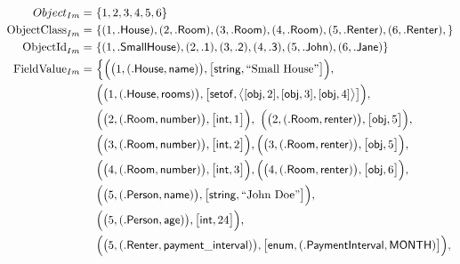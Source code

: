 \begin{figure}[p]
    \begin{subfigure}{\textwidth}
        \centering
        \begin{align*}
            Object_{Im} =\ & \{ 
                1, 2, 3, 4, 5, 6
            \}\\
            \mathrm{ObjectClass}_{Im} =\ & \{ 
                ( 1, .\type{House} ),
                ( 2, .\type{Room} ),
                ( 3, .\type{Room} ), 
                ( 4, .\type{Room} ),
                ( 5, .\type{Renter} ),
                ( 6, .\type{Renter} ),
            \}\\
            \mathrm{ObjectId}_{Im} =\ & \{ 
                ( 1, .\type{SmallHouse} ),
                ( 2, .\type{1} ),
                ( 3, .\type{2} ), 
                ( 4, .\type{3} ),
                ( 5, .\type{John} ),
                ( 6, .\type{Jane} )
            \}\\
            \mathrm{FieldValue}_{Im} =\ & \Big\{ 
                \Big( \big( 1, ( .\type{House}, \type{name} ) \big), \big[ \type{string}, \text{``Small House''} \big] \Big),\\&
                \Big( \big( 1, ( .\type{House}, \type{rooms} ) \big), \big[ \type{setof}, \big\langle [ \type{obj}, 2 ], [ \type{obj}, 3 ], [ \type{obj}, 4 ] \big\rangle \big] \Big),\\&
                \Big( \big( 2, ( .\type{Room}, \type{number} ) \big), \big[ \type{int}, 1 \big] \Big),\
                \Big( \big( 2, ( .\type{Room}, \type{renter} ) \big), \big[ \type{obj}, 5 \big] \Big),\\&
                \Big( \big( 3, ( .\type{Room}, \type{number} ) \big), \big[ \type{int}, 2 \big] \Big),
                \Big( \big( 3, ( .\type{Room}, \type{renter} ) \big), \big[ \type{obj}, 5 \big] \Big),\\&
                \Big( \big( 4, ( .\type{Room}, \type{number} ) \big), \big[ \type{int}, 3 \big] \Big),
                \Big( \big( 4, ( .\type{Room}, \type{renter} ) \big), \big[ \type{obj}, 6 \big] \Big),\\&
                \Big( \big( 5, ( .\type{Person}, \type{name} ) \big), \big[ \type{string}, \text{``John Doe''} \big] \Big),\\&
                \Big( \big( 5, ( .\type{Person}, \type{age} ) \big), \big[ \type{int}, 24 \big] \Big),\\&
                \Big( \big( 5, ( .\type{Renter}, \type{payment\_interval} ) \big), \big[ \type{enum}, ( .\type{PaymentInterval}, \type{MONTH} ) \big] \Big),\\&

\end{align*}
\end{subfigure}
\end{figure}
